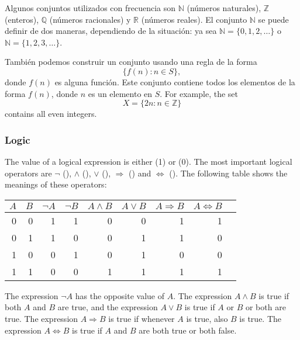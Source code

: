 Algunos conjuntos utilizados con frecuencia son
$\mathbb{N}$ (números naturales),
$\mathbb{Z}$ (enteros),
$\mathbb{Q}$ (números racionales) y
$\mathbb{R}$ (números reales).
El conjunto $\mathbb{N}$
se puede definir de dos maneras, dependiendo
de la situación:
ya sea $\mathbb{N}=\{0,1,2,\ldots\}$
o $\mathbb{N}=\{1,2,3,\ldots\}$.

También podemos construir un conjunto usando una regla de la forma
\[\{f(n) : n \in S\},\]
donde $f(n)$ es alguna función.
Este conjunto contiene todos los elementos de la forma $f(n)$,
donde $n$ es un elemento en $S$.
For example, the set
\[X=\{2n : n \in \mathbb{Z}\}\]
contains all even integers.

\subsubsection{Logic}


The value of a logical expression is either
 (1) or  (0).
The most important logical operators are
$\lnot$ (),
$\land$ (),
$\lor$ (),
$\Rightarrow$ () and
$\Leftrightarrow$ ().
The following table shows the meanings of these operators:

\begin{center}
\begin{tabular}{rr|rrrrrrr}
$A$ & $B$ & $\lnot A$ & $\lnot B$ & $A \land B$ & $A \lor B$ & $A \Rightarrow B$ & $A \Leftrightarrow B$ \\
\hline
0 & 0 & 1 & 1 & 0 & 0 & 1 & 1 \\
0 & 1 & 1 & 0 & 0 & 1 & 1 & 0 \\
1 & 0 & 0 & 1 & 0 & 1 & 0 & 0 \\
1 & 1 & 0 & 0 & 1 & 1 & 1 & 1 \\
\end{tabular}
\end{center}

The expression $\lnot A$ has the opposite value of $A$.
The expression $A \land B$ is true if both $A$ and $B$
are true,
and the expression $A \lor B$ is true if $A$ or $B$ or both
are true.
The expression $A \Rightarrow B$ is true
if whenever $A$ is true, also $B$ is true.
The expression $A \Leftrightarrow B$ is true
if $A$ and $B$ are both true or both false.


